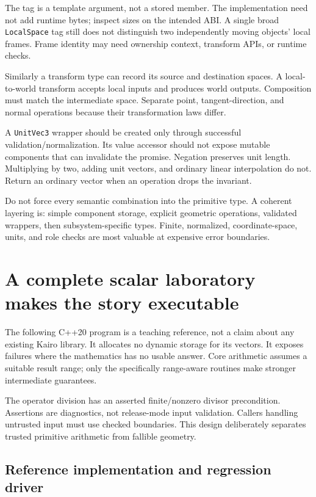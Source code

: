 The tag is a template argument, not a stored member. The implementation need not add runtime bytes; inspect sizes on the intended ABI. A single broad \texttt{LocalSpace} tag still does not distinguish two independently moving objects' local frames. Frame identity may need ownership context, transform APIs, or runtime checks.

Similarly a transform type can record its source and destination spaces. A local-to-world transform accepts local inputs and produces world outputs. Composition must match the intermediate space. Separate point, tangent-direction, and normal operations because their transformation laws differ.

A \texttt{UnitVec3} wrapper should be created only through successful validation/normalization. Its value accessor should not expose mutable components that can invalidate the promise. Negation preserves unit length. Multiplying by two, adding unit vectors, and ordinary linear interpolation do not. Return an ordinary vector when an operation drops the invariant.

Do not force every semantic combination into the primitive type. A coherent layering is: simple component storage, explicit geometric operations, validated wrappers, then subsystem-specific types. Finite, normalized, coordinate-space, units, and role checks are most valuable at expensive error boundaries.

\section{A complete scalar laboratory makes the story executable}\label{02-foundations-ii-ch037-a-complete-scalar-laboratory-makes-the-story-executable}

The following C++20 program is a teaching reference, not a claim about any existing Kairo library. It allocates no dynamic storage for its vectors. It exposes failures where the mathematics has no usable answer. Core arithmetic assumes a suitable result range; only the specifically range-aware routines make stronger intermediate guarantees.

The operator division has an asserted finite/nonzero divisor precondition. Assertions are diagnostics, not release-mode input validation. Callers handling untrusted input must use checked boundaries. This design deliberately separates trusted primitive arithmetic from fallible geometry.

\subsection{Reference implementation and regression driver}\label{02-foundations-ii-ch037-reference-implementation-and-regression-driver}

